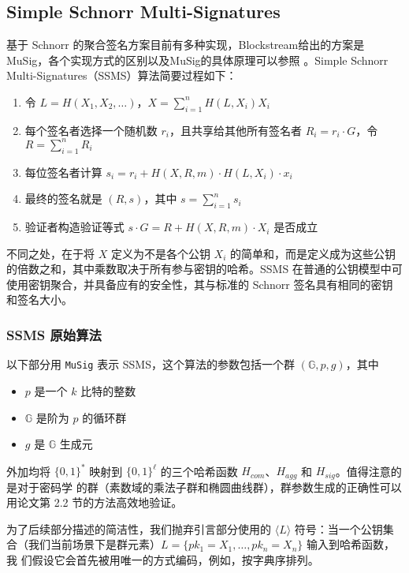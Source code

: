 \documentclass[a4paper,10pt]{article}
\begin{document}
\subsection{Simple  Schnorr  Multi-Signatures}

基于 Schnorr 的聚合签名方案目前有多种实现，Blockstream给出的方案是MuSig，各个实现方式的区别以及MuSig的具体原理可以参照 \cite{2019Simple,The-MuSig-Schnorr-Signature-Scheme}。Simple  Schnorr  Multi-Signatures（SSMS）算法简要过程如下：

\begin{enumerate}
  \item 令 \(L=H(X_1,X_2,\dots)\)，\(X=\sum_{i=1}^n H(L,X_i)X_i\)
  \item 每个签名者选择一个随机数 \(r_i\)，且共享给其他所有签名者 \(R_i=r_i\cdot G\)，令 \(R=\sum_{i=1}^n R_i\)
  \item 每位签名者计算 \(s_i=r_i+H(X,R,m)\cdot H(L,X_i)\cdot x_i\)
  \item 最终的签名就是 \((R,s)\)，其中 \(s=\sum_{i=1}^n s_i\)
  \item\label{ms-bn-verify} 验证者构造验证等式 \(s\cdot G=R+H(X,R,m)\cdot X_i\) 是否成立 
\end{enumerate}

不同之处，在于将 \(X\) 定义为不是各个公钥 \(X_i\) 的简单和，而是定义成为这些公钥的倍数之和，其中乘数取决于所有参与密钥的哈希。SSMS 在普通的公钥模型中可使用密钥聚合，并具备应有的安全性，其与标准的 Schnorr 签名具有相同的密钥和签名大小。

\subsubsection{SSMS 原始算法}
以下部分用 \texttt{MuSig} 表示 SSMS，这个算法的参数包括一个群 \((\mathbb{G},p,g)\)，其中
\begin{itemize}
  \item \(p\) 是一个 \(k\) 比特的整数
  \item \(\mathbb{G}\) 是阶为 \(p\) 的循环群
  \item \(g\) 是 \(\mathbb{G}\) 生成元
\end{itemize}

外加均将 \(\{0,1\}^*\) 映射到 \(\{0,1\}^{\ell}\) 的三个哈希函数 \(H_{com}\)、\(H_{agg}\) 和 \(H_{sig}\)。值得注意的是对于密码学
的群（素数域的乘法子群和椭圆曲线群），群参数生成的正确性可以用论文第 2.2 节的方法高效地验证。

为了后续部分描述的简洁性，我们抛弃引言部分使用的 \(\langle L \rangle\) 符号：当一个公钥集合（我们当前场景下是群元素）\(L=\{pk_1=X_1,\dots,pk_n=X_n\}\) 输入到哈希函数，我
们假设它会首先被用唯一的方式编码，例如，按字典序排列。
\end{document}
